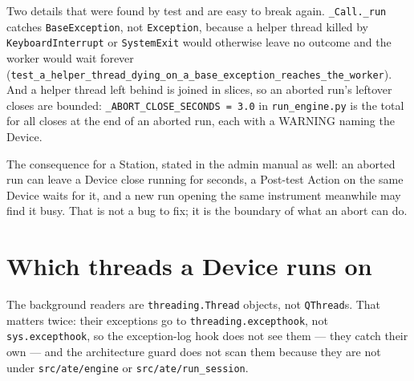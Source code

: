 Two details that were found by test and are easy to break again. \texttt{\_Call.\_run} catches
\texttt{BaseException}, not \texttt{Exception}, because a helper thread killed by \texttt{KeyboardInterrupt}
or \texttt{SystemExit} would otherwise leave no outcome and the worker would wait forever
(\texttt{test\_\allowbreak{}a\_\allowbreak{}helper\_\allowbreak{}thread\_\allowbreak{}dying\_\allowbreak{}on\_\allowbreak{}a\_\allowbreak{}base\_\allowbreak{}exception\_\allowbreak{}reaches\_\allowbreak{}the\_\allowbreak{}worker}). And a helper thread
left behind is joined in slices, so an aborted run's leftover closes are bounded:
\texttt{\_\allowbreak{}ABORT\_\allowbreak{}CLOSE\_\allowbreak{}SECONDS = 3.0} in \texttt{run\_engine.py} is the total for all closes at the end of
an aborted run, each with a WARNING naming the Device.

The consequence for a Station, stated in the admin manual as well: an aborted run can leave a Device
close running for seconds, a Post-test Action on the same Device waits for it, and a new run opening the
same instrument meanwhile may find it busy. That is not a bug to fix; it is the boundary of what an abort
can do.

\section{Which threads a Device runs on}

The background readers are \texttt{threading.Thread} objects, not \texttt{QThread}s. That matters twice:
their exceptions go to \texttt{threading.excepthook}, not \texttt{sys.excepthook}, so the
exception-log hook does not see them --- they catch their own --- and the architecture guard does not
scan them because they are not under \texttt{src/ate/engine} or \texttt{src/ate/run\_session}.

